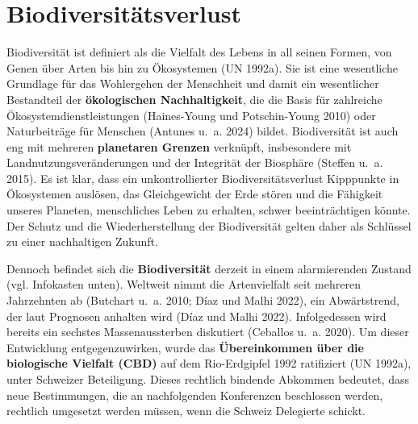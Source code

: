 \documentclass[
  nswissgerman,
  a4paper,
  openany]{book}
\begin{document}
\section{Biodiversitätsverlust}\label{biodiversituxe4tsverlust}

Biodiversität ist definiert als die Vielfalt des Lebens in all seinen
Formen, von Genen über Arten bis hin zu Ökosystemen (UN 1992a). Sie ist
eine wesentliche Grundlage für das Wohlergehen der Menschheit und damit
ein wesentlicher Bestandteil der \textbf{ökologischen Nachhaltigkeit},
die die Basis für zahlreiche Ökosystemdienstleistungen (Haines-Young und
Potschin-Young 2010) oder Naturbeiträge für Menschen (Antunes u.~a.
2024) bildet. Biodiversität ist auch eng mit mehreren \textbf{planetaren
Grenzen} verknüpft, insbesondere mit Landnutzungsveränderungen und der
Integrität der Biosphäre ({Steffen u.~a.} 2015). Es ist klar, dass ein
unkontrollierter Biodiversitätsverlust Kipppunkte in Ökosystemen
auslösen, das Gleichgewicht der Erde stören und die Fähigkeit unseres
Planeten, menschliches Leben zu erhalten, schwer beeinträchtigen könnte.
Der Schutz und die Wiederherstellung der Biodiversität gelten daher als
Schlüssel zu einer nachhaltigen Zukunft.

Dennoch befindet sich die \textbf{Biodiversität} derzeit in einem
alarmierenden Zustand (vgl. Infokasten unten). Weltweit nimmt die
Artenvielfalt seit mehreren Jahrzehnten ab ({Butchart u.~a.} 2010; Díaz
und Malhi 2022), ein Abwärtstrend, der laut Prognosen anhalten wird
(Díaz und Malhi 2022). Infolgedessen wird bereits ein sechstes
Massenaussterben diskutiert (Ceballos u.~a. 2020). Um dieser Entwicklung
entgegenzuwirken, wurde das \textbf{Übereinkommen über die biologische
Vielfalt (CBD)} auf dem Rio-Erdgipfel 1992 ratifiziert (UN 1992a), unter
Schweizer Beteiligung. Dieses rechtlich bindende Abkommen bedeutet, dass
neue Bestimmungen, die an nachfolgenden Konferenzen beschlossen werden,
rechtlich umgesetzt werden müssen, wenn die Schweiz Delegierte schickt.
\end{document}
